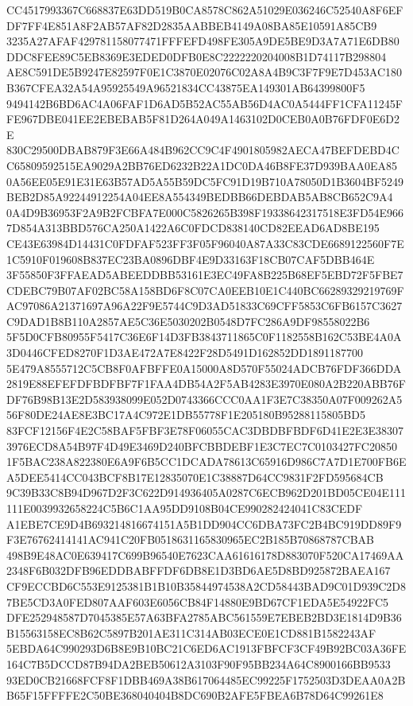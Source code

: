 \documentclass[UTF8,fontset=fandol,zihao=-4,a4paper]{ctexart}
\begin{document}
{{CC4517993367C668837E63DD519B0CA8578C862A51029E036246C52540A8F6EFDF7FF4E851A8F2AB57AF82D2835AABBEB4149A08BA85E10591A85CB9
3235A27AFAF429781158077471FFFEFD498FE305A9DE5BE9D3A7A71E6DB80DDC8FEE89C5EB8369E3EDED0DFB0E8C2222220204008B1D74117B298804
AE8C591DE5B9247E82597F0E1C3870E02076C02A8A4B9C3F7F9E7D453AC180B367CFEA32A54A95925549A96521834CC43875EA149301AB64399800F5
9494142B6BD6AC4A06FAF1D6AD5B52AC55AB56D4AC0A5444FF1CFA11245FFE967DBE041EE2EBEBAB5F81D264A049A1463102D0CEB0A0B76FDF0E6D2E
830C29500DBAB879F3E66A484B962CC9C4F4901805982AECA47BEFDEBD4CC65809592515EA9029A2BB76ED6232B22A1DC0DA46B8FE37D939BAA0EA85
0A56EE05E91E31E63B57AD5A55B59DC5FC91D19B710A78050D1B3604BF5249BEB2D85A92244912254A04EE8A554349BEDBB66DEBDAB5AB8CB652C9A4
0A4D9B36953F2A9B2FCBFA7E000C5826265B398F19338642317518E3FD54E9667D854A313BBD576CA250A1422A6C0FDCD838140CD82EEAD6AD8BE195
CE43E63984D14431C0FDFAF523FF3F05F96040A87A33C83CDE6689122560F7E1C5910F019608B837EC23BA0896DBF4E9D33163F18CB07CAF5DBB464E
3F55850F3FFAEAD5ABEEDDBB53161E3EC49FA8B225B68EF5EBD72F5FBE7CDEBC79B07AF02BC58A158BD6F8C07CA0EEB10E1C440BC66289329219769F
AC97086A21371697A96A22F9E5744C9D3AD51833C69CFF5853C6FB6157C3627C9DAD1B8B110A2857AE5C36E5030202B0548D7FC286A9DF98558022B6
5F5D0CFB80955F5417C36E6F14D3FB3843711865C0F1182558B162C53BE4A0A3D0446CFED8270F1D3AE472A7E8422F28D5491D162852DD1891187700
5E479A8555712C5CB8F0AFBFFE0A15000A8D570F55024ADCB76FDF366DDA2819E88EFEFDFBDFBF7F1FAA4DB54A2F5AB4283E3970E080A2B220ABB76F
DF76B98B13E2D583938099E052D0743366CCC0AA1F3E7C38350A07F009262A556F80DE24AE8E3BC17A4C972E1DB55778F1E205180B95288115805BD5
83FCF12156F4E2C58BAF5FBF3E78F06055CAC3DBDBFBDF6D41E2E3E383073976ECD8A54B97F4D49E3469D240BFCBBDEBF1E3C7EC7C0103427FC20850
1F5BAC238A822380E6A9F6B5CC1DCADA78613C65916D986C7A7D1E700FB6EA5DEE5414CC043BCF8B17E12835070E1C38887D64CC9831F2FD595684CB
9C39B33C8B94D967D2F3C622D914936405A0287C6ECB962D201BD05CE04E111111E0039932658224C5B6C1AA95DD9108B04CE990282424041C83CEDF
A1EBE7CE9D4B693214816674151A5B1DD904CC6DBA73FC2B4BC919DD89F9F3E76762414141AC941C20FB0518631165830965EC2B185B70868787CBAB
498B9E48AC0E639417C699B96540E7623CAA61616178D883070F520CA17469AA2348F6B032DFB96EDDBABFFDF6DB8E1D3BD6AE5D8BD925872BAEA167
CF9ECCBD6C553E9125381B1B10B35844974538A2CD58443BAD9C01D939C2D87BE5CD3A0FED807AAF603E6056CB84F14880E9BD67CF1EDA5E54922FC5
DFE252948587D7045385E57A63BFA2785ABC561559E7EBEB2BD3E1814D9B36B15563158EC8B62C5897B201AE311C314AB03ECE0E1CD881B1582243AF
5EBDA64C990293D6B8E9B10BC21C6ED6AC1913FBFCF3CF49B92BC03A36FE164C7B5DCCD87B94DA2BEB50612A3103F90F95BB234A64C8900166BB9533
93ED0CB21668FCF8F1DBB469A38B617064485EC99225F1752503D3DEAA0A2BB65F15FFFFE2C50BE368040404B8DC690B2AFE5FBEA6B78D64C99261E8
}}
\end{document}

